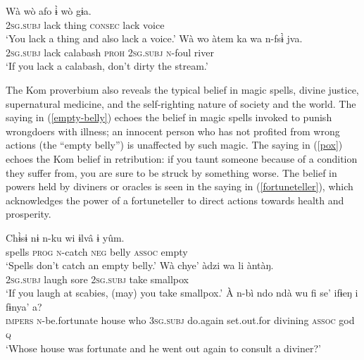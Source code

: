 \documentclass[output=paper,colorlinks,citecolor=brown
]{langscibook}
\begin{document}
\ea \label{ex:moralRiddle}
\begin{xlist}
\ex \label{lack}
\gll Wà wò afo ɨ̀ wò gɨa.\\
\textsc{2sg.subj} lack thing \textsc{consec} lack voice\\
\glt `You lack a thing and also lack a voice.'
\ex \label{gourd}
\gll Wà wo àtem ka wa n-fsɨ̀ jva.\\
\textsc{2sg.subj} lack calabash \textsc{proh} \textsc{2sg.subj} \textsc{n}-foul river\\
\glt `If you lack a calabash, don’t dirty the stream.'
\end{xlist}
\z

The Kom proverbium also reveals the typical belief in magic spells, divine justice, supernatural medicine, and the self-righting nature of society and the world. 
The saying in (\ref{empty-belly}) echoes the belief in magic spells invoked to punish wrongdoers with illness; an innocent person who has not profited from wrong actions (the ``empty belly'') is unaffected by such magic. 
The saying in (\ref{pox}) echoes the Kom belief in retribution: if you taunt someone because of a condition they suffer from, you are sure to be struck by something worse. 
The belief in powers held by diviners or oracles is seen in the saying in (\ref{fortuneteller}), which acknowledges the power of a fortuneteller to direct actions towards health and prosperity. 

\ea \label{ex:moral}
\begin{xlist}
\ex \label{empty-belly}
\gll Chɨ̀sɨ nɨ n-ku wi ɨlvâ ɨ yûm.\\
spells \textsc{prog} \textsc{n}-catch \textsc{neg} belly \textsc{assoc} empty\\
\glt `Spells don't catch an empty belly.' 
\ex \label{pox}
\gll Wà chye’ àdzi wa li àntàŋ.\\
\textsc{2sg.subj} laugh sore \textsc{2sg.subj} take smallpox\\
\glt `If you laugh at scabies, (may) you take smallpox.'
\ex \label{fortuneteller}
\gll À n-bì ndo ndà wu fi se’ ifɨeŋ i fɨnya' a?\\
\textsc{impers} \textsc{n}-be.fortunate house who \textsc{3sg.subj} do.again set.out.for divining \textsc{assoc} god \textsc{q}\\
\glt
`Whose house was fortunate and he went out again to consult a diviner?'
\end{xlist}
\z
\end{document}
